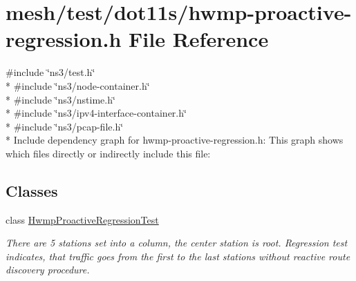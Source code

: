 \hypertarget{hwmp-proactive-regression_8h}{}\section{mesh/test/dot11s/hwmp-\/proactive-\/regression.h File Reference}
\label{hwmp-proactive-regression_8h}
{\ttfamily \#include \char`\"{}ns3/test.\+h\char`\"{}}\\*
{\ttfamily \#include \char`\"{}ns3/node-\/container.\+h\char`\"{}}\\*
{\ttfamily \#include \char`\"{}ns3/nstime.\+h\char`\"{}}\\*
{\ttfamily \#include \char`\"{}ns3/ipv4-\/interface-\/container.\+h\char`\"{}}\\*
{\ttfamily \#include \char`\"{}ns3/pcap-\/file.\+h\char`\"{}}\\*
Include dependency graph for hwmp-\/proactive-\/regression.h\+:
This graph shows which files directly or indirectly include this file\+:
\subsection*{Classes}
\begin{DoxyCompactItemize}
\item 
class \hyperlink{classHwmpProactiveRegressionTest}{Hwmp\+Proactive\+Regression\+Test}
\begin{DoxyCompactList}\small\item\em There are 5 stations set into a column, the center station is root. Regression test indicates, that traffic goes from the first to the last stations without reactive route discovery procedure. \end{DoxyCompactList}\end{DoxyCompactItemize}
